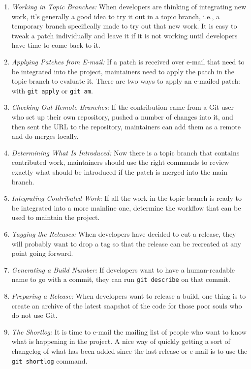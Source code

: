 \documentclass[draftclsnofoot,journal,onecolumn,12pt]{IEEEtran}
\begin{document}
\begin{enumerate}
  \item \textit{Working in Topic Branches:} When developers are thinking of integrating new work, it’s generally a good idea to try it out in a topic branch, i.e., a temporary branch specifically made to try out that new work. It is easy to tweak a patch individually and leave it if it is not working until developers have time to come back to it.
  \item \textit{Applying Patches from E-mail:} If a patch is received over e-mail that need to be integrated into the project, maintainers need to apply the patch in the topic branch to evaluate it. There are two ways to apply an e-mailed patch: with \texttt{git apply} or \texttt{git am}.
  \item \textit{Checking Out Remote Branches:} If the contribution came from a Git user who set up their own repository, pushed a number of changes into it, and then sent the URL to the repository, maintainers can add them as a remote and do merges locally.
  \item \textit{Determining What Is Introduced:} Now there is a topic branch that contains contributed work, maintainers should use the right commands to review exactly what should be introduced if the patch is merged into the main branch.
  \item \textit{Integrating Contributed Work:} If all the work in the topic branch is ready to be integrated into a more mainline one, determine the workflow that can be used to maintain the project.
  \item \textit{Tagging the Releases:} When developers have decided to cut a release, they will probably want to drop a tag so that the release can be recreated at any point going forward.
  \item \textit{Generating a Build Number:} If developers want to have a human-readable name to go with a commit, they can run \texttt{git describe} on that commit.
  \item \textit{Preparing a Release:} When developers want to release a build, one thing is to create an archive of the latest snapshot of the code for those poor souls who do not use Git.
  \item \textit{The Shortlog:} It is time to e-mail the mailing list of people who want to know what is happening in the project. A nice way of quickly getting a sort of changelog of what has been added since the last release or e-mail is to use the \texttt{git shortlog} command.
\end{enumerate}
\end{document}
